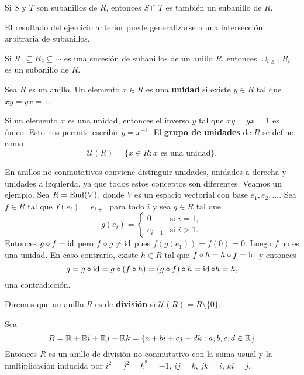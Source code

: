 \begin{exercise}
Si $S$ y $T$ son subanillos de $R$, entonces $S\cap T$ es también un subanillo de $R$.	
\end{exercise}

El resultado del ejercicio anterior puede generalizarse a una intersección arbitraria de subanillos. 

\begin{exercise}
Si $R_1\subseteq R_2\subseteq\cdots$ es una sucesión de subanillos de un anillo $R$, entonces $\cup_{i\geq1}R_i$ es un subanillo de $R$.	
\end{exercise}

\begin{definition}
Sea $R$ es un anillo. Un elemento $x\in R$ es una \textbf{unidad} si existe $y\in R$ tal que $xy=yx=1$.   	
\end{definition}

Si un elemento $x$ es una unidad, entonces el inverso $y$ tal que $xy=yx=1$ es único. Esto nos permite 
escribir $y=x^{-1}$.  
El \textbf{grupo de unidades} de $R$ se define como
\[
\mathcal{U}(R)=\{x\in R:x\text{ es una unidad}\}.
\]

En anillos no conmutativos conviene distinguir unidades, unidades a derecha y unidades a izquierda, ya que todos
estos conceptos son diferentes. Veamos un ejemplo. Sea $R=\operatorname{End}(V)$, donde $V$ es un espacio vectorial
con base $e_1,e_2,\dots$. Sea $f\in R$ tal que $f(e_i)=e_{i+1}$ para todo $i$ y sea $g\in R$ tal que
\[
g(e_i)=\begin{cases}
0 & \text{si $i=1$},\\
e_{i-1} & \text{si $i>1$}.	
\end{cases}
\]
Entonces $g\circ f=\operatorname{id}$ pero $f\circ g\ne\operatorname{id}$ pues $f(g(e_1))=f(0)=0$. 
Luego $f$ no es una unidad. En caso contrario, existe $h\in R$ tal que $f\circ h=h\circ f=\operatorname{id}$ y entonces
\[
g=g\circ\operatorname{id}=g\circ (f\circ h)=(g\circ f)\circ h=\operatorname{id}\circ h=h,
\]
una contradicción. 

\begin{definition}
Diremos que un anillo $R$ es de \textbf{división} si $\mathcal{U}(R)=R\setminus\{0\}$.  	
\end{definition}

\begin{example}
Sea 
\[
R=\mathbb{R}+\mathbb{R} i+\mathbb{R} j+\mathbb{R} k=\{a+bi+cj+dk:a,b,c,d\in\mathbb{R}\}
\]
Entonces $R$ es un anillo de división no conmutativo con la suma usual y 
la multiplicación inducida por 
$i^2=j^2=k^2=-1$, $ij=k$, $jk=i$, $ki=j$. 
\end{example}

